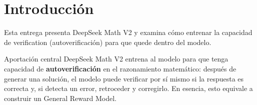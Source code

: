 \section{Introducción}
Esta entrega presenta DeepSeek Math V2 y examina cómo entrenar la capacidad de verification (autoverificación) para que quede dentro del modelo.

\begin{importantbox}{Aportación central}
DeepSeek Math V2 entrena al modelo para que tenga capacidad de \textbf{autoverificación} en el razonamiento matemático: después de generar una solución, el modelo puede verificar por sí mismo si la respuesta es correcta y, si detecta un error, retroceder y corregirlo. En esencia, esto equivale a construir un General Reward Model.
\end{importantbox}


